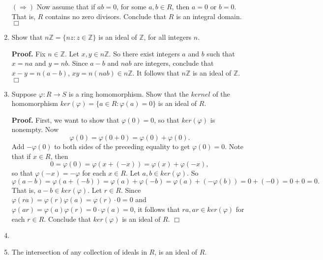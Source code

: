 \documentclass[9pt]{article}
\newcommand{\qed}{\hfill \ensuremath{\Box}}
\newcommand{\Z}{\mathbb{Z}}
\begin{document}
\begin{enumerate}
      $(\Rightarrow)$ Now assume that if $ab = 0$, for some $a, b \in R$, then
      $a = 0$ or $b = 0$. That is, $R$ contains no zero divisors. Conclude that
      $R$ is an integral domain. \qed
   \item Show that $n\Z = \{nz : z \in \Z\}$ is an ideal of $\Z$, for all
         integers $n$.
         
      \textbf{Proof.} Fix $n \in \Z$. Let $x, y \in n\Z$. So there exist
      integers $a$ and $b$ such that $x = na$ and $y = nb$. Since
      $a - b$ and $nab$ are integers, conclude that $x - y = n(a - b)$, 
      $xy = n(nab) \in n\Z$. It follows that $n\Z$ is an ideal of $\Z$. \qed
   \item Suppose $\varphi : R \rightarrow S$ is a ring homomorphism. Show that
         the $\textit{kernel}$ of the homomorphism
         $ker(\varphi) = \{a \in R : \varphi(a) = 0\}$ is an ideal of $R$.
         
      \textbf{Proof.} First, we want to show that $\varphi(0) = 0$, so that
      $ker(\varphi)$ is nonempty. Now
      $$\varphi(0) = \varphi(0 + 0) = \varphi(0) + \varphi(0).$$
      Add $-\varphi(0)$ to both sides of the preceding equality to get
      $\varphi(0) = 0$. Note that if $x \in R$, then
      $$0 = \varphi(0) = \varphi(x + (-x)) = \varphi(x) + \varphi(-x),$$
      so that $\varphi(-x) = -\varphi$ for each $x \in R$.
      Let $a, b \in ker(\varphi)$. So
      $$\varphi(a - b) = \varphi(a + (-b)) = \varphi(a) + \varphi(-b) =
      \varphi(a) + (-\varphi(b)) = 0 + (-0) = 0  + 0 = 0.$$
      That is, $a - b \in ker(\varphi)$. Let $r \in R$. Since
      $\varphi(ra) = \varphi(r)\varphi(a) = \varphi(r)\cdot 0 = 0$ and
      $\varphi(ar) = \varphi(a)\varphi(r) = 0 \cdot\varphi(a) = 0$, it follows
      that $ra, ar \in ker(\varphi)$ for each $r \in R$. Conclude that
      $ker(\varphi)$ is an ideal of $R$. \qed
   \item 
   \item The intersection of any collection of ideals in $R$, is an ideal of
         $R$.
         

\end{enumerate}
\end{document}
